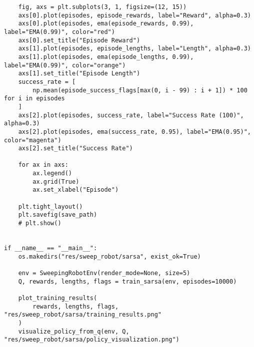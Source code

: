 \begin{verbatim}
    fig, axs = plt.subplots(3, 1, figsize=(12, 15))
    axs[0].plot(episodes, episode_rewards, label="Reward", alpha=0.3)
    axs[0].plot(episodes, ema(episode_rewards, 0.99), label="EMA(0.99)", color="red")
    axs[0].set_title("Episode Reward")
    axs[1].plot(episodes, episode_lengths, label="Length", alpha=0.3)
    axs[1].plot(episodes, ema(episode_lengths, 0.99), label="EMA(0.99)", color="orange")
    axs[1].set_title("Episode Length")
    success_rate = [
        np.mean(episode_success_flags[max(0, i - 99) : i + 1]) * 100 for i in episodes
    ]
    axs[2].plot(episodes, success_rate, label="Success Rate (100)", alpha=0.3)
    axs[2].plot(episodes, ema(success_rate, 0.95), label="EMA(0.95)", color="magenta")
    axs[2].set_title("Success Rate")

    for ax in axs:
        ax.legend()
        ax.grid(True)
        ax.set_xlabel("Episode")

    plt.tight_layout()
    plt.savefig(save_path)
    # plt.show()


if __name__ == "__main__":
    os.makedirs("res/sweep_robot/sarsa", exist_ok=True)

    env = SweepingRobotEnv(render_mode=None, size=5)
    Q, rewards, lengths, flags = train_sarsa(env, episodes=10000)

    plot_training_results(
        rewards, lengths, flags, "res/sweep_robot/sarsa/training_results.png"
    )
    visualize_policy_from_q(env, Q, "res/sweep_robot/sarsa/policy_visualization.png")

\end{verbatim}
